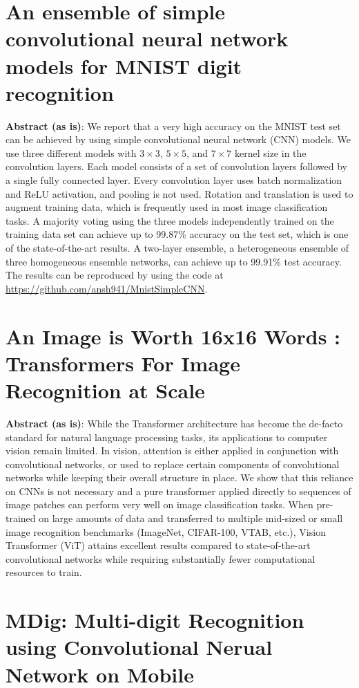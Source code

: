 \documentclass[12pt, a4paper]{report}
\begin{document}
\section{An ensemble of simple convolutional neural network models for MNIST digit recognition}
\label{sec:litppr3}

\textbf{Abstract (as is)}: We report that a very high accuracy on the MNIST test set can be achieved by using simple convolutional neural network (CNN) models. We use three different models with $3\times 3$, $5\times 5$, and $7\times 7$ kernel size in the convolution layers. Each model consists of a set of convolution layers followed by a single fully connected layer. Every convolution layer uses batch normalization and ReLU activation, and pooling is not used. Rotation and translation is used to augment training data, which is frequently used in most image classification tasks. A majority voting using the three models independently trained on the training data set can achieve up to 99.87\% accuracy on the test set, which is one of the state-of-the-art results. A two-layer ensemble, a heterogeneous ensemble of three homogeneous ensemble networks, can achieve up to 99.91\% test accuracy. The results can be reproduced by using the code at \url{https://github.com/ansh941/MnistSimpleCNN}.

\section{An Image is Worth 16x16 Words : Transformers For Image Recognition at Scale}
\label{sec:litppr4}

\textbf{Abstract (as is)}: While the Transformer architecture has become the de-facto standard for natural language processing tasks, its applications to computer vision remain limited. In vision, attention is either applied in conjunction with convolutional networks, or used to replace certain components of convolutional networks while keeping their overall structure in place. We show that this reliance on CNNs is not necessary and a pure transformer applied directly to sequences of image patches can perform very well on image classification tasks. When pre-trained on large amounts of data and transferred to multiple mid-sized or small image recognition benchmarks (ImageNet, CIFAR-100, VTAB, etc.), Vision Transformer (ViT) attains excellent results compared to state-of-the-art convolutional networks while requiring substantially fewer computational resources to train.

\section{MDig: Multi-digit Recognition using Convolutional Nerual Network on Mobile}
\label{sec:litppr5}
\end{document}
